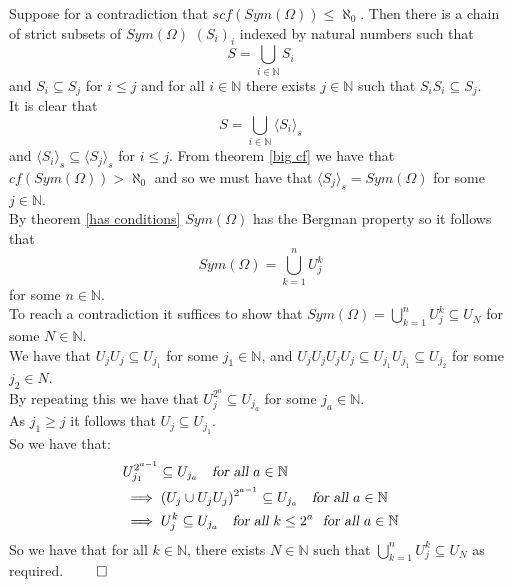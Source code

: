 \documentclass{report}
\begin{document}
Suppose for a contradiction that $scf(Sym(\Omega)) \leq \aleph_0$. Then there is a chain of strict subsets of $Sym(\Omega)$ $(S_i)_i$ indexed by natural numbers such that $$S =\bigcup_{i\in \mathbb{N}}S_i$$
and $S_i \subseteq S_j$ for $i \leq j$
and for all $i\in \mathbb{N}$ there exists $j \in \mathbb{N}$ such that $S_iS_i \subseteq S_j$.\\
It is clear that $$S =\bigcup_{i\in \mathbb{N}} \langle S_i \rangle_s$$
and $\langle S_i \rangle_s \subseteq \langle  S_j \rangle_s$ for $i \leq j$. From theorem \ref{big cf} we have that $cf(Sym(\Omega)) > \aleph_0$ and so we must have that $\langle S_j \rangle_s = Sym(\Omega)$ for some $j \in \mathbb{N}$.\\
By theorem \ref{has conditions} $Sym(\Omega)$ has the Bergman property so it follows that $$Sym(\Omega) = \bigcup _{k = 1}^{n} U_j^{k}$$ for some $n \in \mathbb{N}$.\\
To reach a contradiction it suffices to show that $Sym(\Omega) = \bigcup _{k = 1}^{n} U_j^{k} \subseteq U_N$ for some $N\in \mathbb{N}$.\\
We have that $U_jU_j \subseteq U_{j_1}$ for some $j_1 \in \mathbb{N}$, and $U_jU_jU_jU_j\subseteq U_{j_1}U_{j_1} \subseteq U_{j_2}$ for some $j_2 \in N$.\\
By repeating this we have that $U_j^{2^a}\subseteq U_{j_a}$ for some $j_a \in \mathbb{N}$.\\
As $j_1 \geq j$ it follows that $U_j \subseteq U_{j_1}$.\\
So we have that:
\begin{align*}
&U_{j_1}^{2^{a-1}} \subseteq U_{j_a} \ \ \ \textsl{for all } a \in \mathbb{N}\\
&\implies (U_{j} \cup U_j U_j)^{2^{a-1}}
 \subseteq U_{j_a} \ \ \ \textsl{for all } a \in \mathbb{N}\\
&\implies U_{j}^{k}
 \subseteq U_{j_a} \ \ \ \textsl{for all } k \leq 2^a \ \ \textsl{for all } a \in \mathbb{N}
\end{align*}
So we have that for all $k \in \mathbb{N}$, there exists $N\in \mathbb{N}$ such that $\bigcup_{k=1}^n U_j^k \subseteq U_N$ as required. $\qed$
\end{document}
